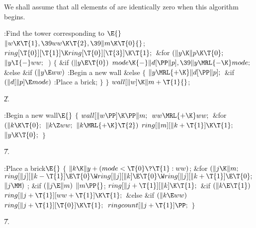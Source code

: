 We shall assume that all elements of  are identically zero
when this algorithm begins.

\Y\B\4:Find the tower corresponding to \X${}\E{}$\6
$\|w\K\T{1},\39\\{ww}\K\T{2},\39\|m\K\T{0}{}$;\6
${}\\{ring}[\T{0}][\T{1}]\K\\{ring}[\T{0}][\T{3}]\K\T{1};{}$\6
\&{for} ${}(\|y\K\|p\K\T{0};{}$ ${}\|y\I{-}\\{ww};{}$ \,)\5
${}\{{}$\1\6
\&{if} ${}(\|y\E\T{0}){}$\1\5
${}\\{mode}\K{-}\|d[\PP\|p],\39\|y\MRL{-{\K}}\\{mode};{}$\2\6
\&{else} \&{if} ${}(\|y\E\\{ww}){}$\1\5
:Begin a new wall\X\2\6
\&{else}\5
${}\{{}$\1\6
${}\|y\MRL{+{\K}}\|d[\PP\|p];{}$\6
\&{if} ${}(\|d[\|p]\E\\{mode}){}$\1\5
:Place a brick\X;\2\6
\4${}\}{}$\2\6
\4${}\}{}$\2\6
${}\\{wall}[\|w]\K\|m+\T{1}{}$;\par
\U2.\fi

\B{}:Begin a new wall\X${}\E{}$\6
${}\{{}$\1\6
${}\\{wall}[\|w\PP]\K\PP\|m;{}$\6
${}\\{ww}\MRL{+{\K}}\\{ww};{}$\6
\&{for} ${}(\|k\K\T{0};{}$ ${}\|k\Z\\{ww};{}$ ${}\|k\MRL{+{\K}}\T{2}){}$\1\5
${}\\{ring}[\|m][\|k+\T{1}]\K\T{1};{}$\2\6
${}\|y\K\T{0};{}$\6
\4${}\}{}$\2\par
\U7.\fi

\B{}:Place a brick\X${}\E{}$\6
${}\{{}$\1\6
${}\|k\K\|y+(\\{mode}<\T{0}\?\T{1}:\\{ww}){}$;\6
\&{for} ${}(\|j\K\|m;{}$ ${}\\{ring}[\|j][\|k-\T{1}]\E\T{0}\W\\{ring}[\|j][\|k]%
\E\T{0}\W\\{ring}[\|j][\|k+\T{1}]\E\T{0};{}$ ${}\|j\MM){}$\1\5
;\2\6
\&{if} ${}(\|j\E\|m){}$\1\5
${}\|m\PP{}$;\2\6
${}\\{ring}[\|j+\T{1}][\|k]\K\T{1};{}$\6
\&{if} ${}(\|k\E\T{1}){}$\1\5
${}\\{ring}[\|j+\T{1}][\\{ww}+\T{1}]\K\T{1};{}$\2\6
\&{else} \&{if} ${}(\|k\E\\{ww}){}$\1\5
${}\\{ring}[\|j+\T{1}][\T{0}]\K\T{1};{}$\2\6
${}\\{ringcount}[\|j+\T{1}]\PP;{}$\6
\4${}\}{}$\2\par
\U7.\fi

